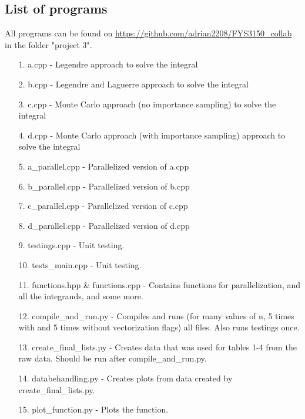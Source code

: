 \documentclass[10pt,a4paper]{article}
\begin{document}
\subsection{List of programs}
All programs can be found on \url{https://github.com/adrian2208/FYS3150_collab} in the folder "project 3".


\begin{itemize}
\item[1.] a.cpp - Legendre approach to solve the integral
\item[2.] b.cpp - Legendre and Laguerre approach to solve the integral
\item[3.] c.cpp - Monte Carlo approach (no importance sampling) to solve the integral
\item[4.] d.cpp - Monte Carlo approach (with importance sampling)  approach to solve the integral
\item[5.] a\_parallel.cpp - Parallelized version of a.cpp
\item[6.] b\_parallel.cpp - Parallelized version of b.cpp
\item[7.] c\_parallel.cpp - Parallelized version of c.cpp
\item[8.] d\_parallel.cpp - Parallelized version of d.cpp
\item[9.] testings.cpp - Unit testing.
\item[10.] tests\_main.cpp - Unit testing.
\item[11.] functions.hpp \& functions.cpp - Contains functions for parallelization, and all the integrands, and some more.
\item[12.] compile\_and\_run.py - Compiles and runs (for many values of n, 5 times with and 5 times without vectorization flags) all files. Also runs testings once.
\item[13.] create\_final\_lists.py - Creates data that was used for tables 1-4 from the raw data. Should be run after compile\_and\_run.py.
\item[14.] databehandling.py - Creates plots from data created by create\_final\_lists.py.
\item[15.] plot\_function.py - Plots the function.
\end{itemize}



\end{document}
